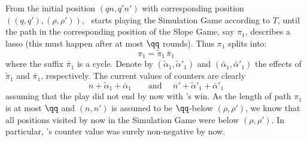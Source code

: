 From the initial position  $(qn,q'n')$ with corresponding position $((q,q'), (\rho,\rho'))$,
\R\ starts playing the Simulation Game according to $T$,
until the path in the corresponding position of the Slope Game, say $\pi_1$,
describes a lasso (this must happen after at most $\qq$ rounds).
Thus $\pi_1$ splits into:
\begin{equation}
  \pi_1 = \widetilde\pi_1 \, \bar\pi_1
\end{equation}
where the suffix $\bar\pi_1$ is a  cycle. Denote by $(\widetilde\alpha_1, \widetilde\alpha'_1)$
and $(\bar\alpha_1, \bar\alpha'_1)$ the effects of $\widetilde\pi_1$ and
$\bar\pi_1$, respectively. 
The current values of counters are clearly
\begin{equation}
 n + \widetilde\alpha_1 + \bar\alpha_1 \qquad \text{and }\quad
 n' + \widetilde\alpha'_1 + \bar\alpha'_1
\end{equation}
assuming that the play did not end by now with \R's win.
As the length of path $\pi_1$ is at most $\qq$ and
$(n,n')$ is assumed to be $\qq$-below $(\rho,\rho')$, we know that
all positions visited by now in the Simulation Game were below $(\rho,\rho')$.
In particular, \R's counter value was surely non-negative by now.


